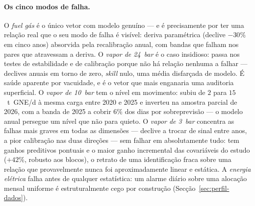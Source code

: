\paragraph{Os cinco modos de falha.} O \emph{fuel gás} é o único vetor com
modelo genuíno --- e é precisamente por ter uma relação real que o seu
modo de falha é visível: deriva paramétrica (declive $-30\%$ em cinco anos)
absorvida pela recalibração anual, com bandas que falham nos pares que
atravessam a deriva. O \emph{vapor de 24~bar} é o caso insidioso: passa nos
testes de estabilidade e de calibração porque não há relação nenhuma a
falhar --- declives anuais em torno de zero, \emph{skill} nulo, uma média
disfarçada de modelo. É saúde aparente por vacuidade, e é o vetor que mais
enganaria uma auditoria superficial. O \emph{vapor de 10~bar} tem o nível em
movimento: subiu de $2$ para $15$~t~GNE/d à mesma carga entre 2020 e 2025 e
inverteu na amostra parcial de 2026, com a banda de 2025 a cobrir $6\%$ dos
dias por sobreprevisão --- o modelo anual persegue um nível que não para
quieto. O
\emph{vapor de 3~bar} concentra as falhas mais graves em todas as dimensões
--- declive a trocar de sinal entre anos, a pior calibração nas duas direções
--- sem falhar em absolutamente tudo: tem ganhos preditivos pontuais e o maior
ganho incremental das covariáveis do estudo ($+42\%$, robusto aos blocos), o retrato de uma
identificação fraca sobre uma relação que provavelmente nunca foi
aproximadamente linear e estática. A
\emph{energia elétrica} falha antes de qualquer estatística: um alarme
diário sobre uma alocação mensal uniforme é estruturalmente cego por
construção (Secção~\ref{sec:perfil-dados}).


